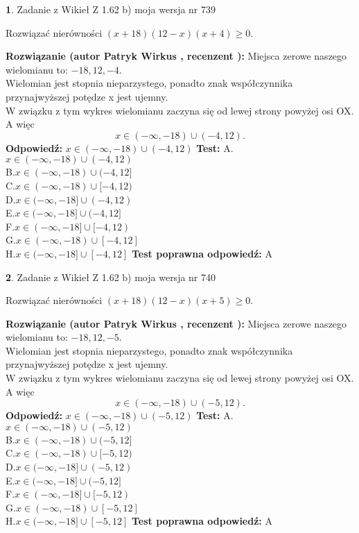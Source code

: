 \documentclass[12pt, a4paper]{article}
\theoremstyle{definition} %
\newtheorem{zad}{}
\newcommand{\zadStart}[1]{\begin{zad}#1\newline}
\newcommand{\zadStop}{\end{zad}}
\newcommand{\rozwStart}[2]{\noindent \textbf{Rozwiązanie (autor #1 , recenzent #2): }\newline}
\newcommand{\rozwStop}{\newline}
\newcommand{\odpStart}{\noindent \textbf{Odpowiedź:}\newline}
\newcommand{\odpStop}{\newline}
\newcommand{\testStart}{\noindent \textbf{Test:}\newline}
\newcommand{\testStop}{\newline}
\newcommand{\kluczStart}{\noindent \textbf{Test poprawna odpowiedź:}\newline}
\newcommand{\kluczStop}{\newline}
\begin{document}
\zadStart{Zadanie z Wikieł Z 1.62 b) moja wersja nr 739}

Rozwiązać nierówności $(x+18)(12-x)(x+4)\ge0$.
\zadStop
\rozwStart{Patryk Wirkus}{}
Miejsca zerowe naszego wielomianu to: $-18, 12, -4$.\\
Wielomian jest stopnia nieparzystego, ponadto znak współczynnika przy\linebreak najwyższej potędze x jest ujemny.\\ W związku z tym wykres wielomianu zaczyna się od lewej strony powyżej osi OX. A więc $$x \in (-\infty,-18) \cup (-4,12).$$
\rozwStop
\odpStart
$x \in (-\infty,-18) \cup (-4,12)$
\odpStop
\testStart
A.$x \in (-\infty,-18) \cup (-4,12)$\\
B.$x \in (-\infty,-18) \cup (-4,12]$\\
C.$x \in (-\infty,-18) \cup [-4,12)$\\
D.$x \in (-\infty,-18] \cup (-4,12)$\\
E.$x \in (-\infty,-18] \cup (-4,12]$\\
F.$x \in (-\infty,-18] \cup [-4,12)$\\
G.$x \in (-\infty,-18) \cup [-4,12]$\\
H.$x \in (-\infty,-18] \cup [-4,12]$
\testStop
\kluczStart
A
\kluczStop



\zadStart{Zadanie z Wikieł Z 1.62 b) moja wersja nr 740}

Rozwiązać nierówności $(x+18)(12-x)(x+5)\ge0$.
\zadStop
\rozwStart{Patryk Wirkus}{}
Miejsca zerowe naszego wielomianu to: $-18, 12, -5$.\\
Wielomian jest stopnia nieparzystego, ponadto znak współczynnika przy\linebreak najwyższej potędze x jest ujemny.\\ W związku z tym wykres wielomianu zaczyna się od lewej strony powyżej osi OX. A więc $$x \in (-\infty,-18) \cup (-5,12).$$
\rozwStop
\odpStart
$x \in (-\infty,-18) \cup (-5,12)$
\odpStop
\testStart
A.$x \in (-\infty,-18) \cup (-5,12)$\\
B.$x \in (-\infty,-18) \cup (-5,12]$\\
C.$x \in (-\infty,-18) \cup [-5,12)$\\
D.$x \in (-\infty,-18] \cup (-5,12)$\\
E.$x \in (-\infty,-18] \cup (-5,12]$\\
F.$x \in (-\infty,-18] \cup [-5,12)$\\
G.$x \in (-\infty,-18) \cup [-5,12]$\\
H.$x \in (-\infty,-18] \cup [-5,12]$
\testStop
\kluczStart
A
\kluczStop
\end{document}
